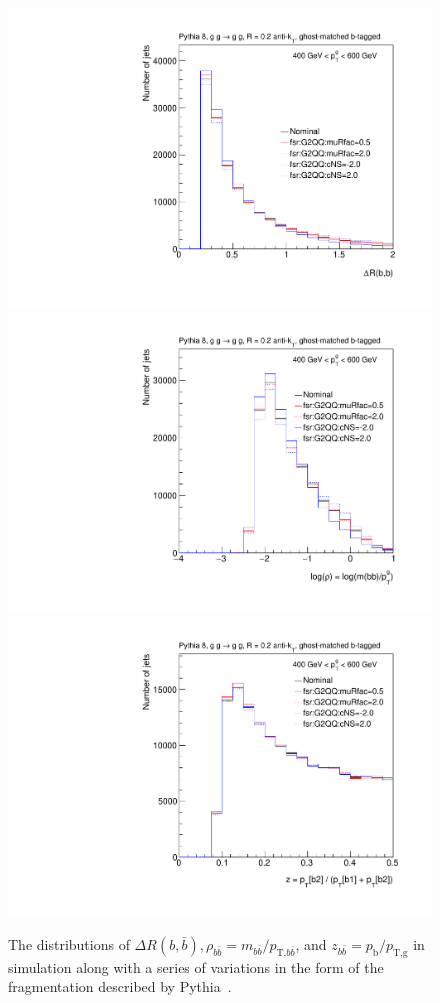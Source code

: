 \begin{figure}[htpb!]
\begin{center}
\includegraphics[width=0.33\linewidth]{figures/gbb/truth_level/DeltaRbb.pdf}\includegraphics[width=0.33\linewidth]{figures/gbb/truth_level/rhobb.pdf}\includegraphics[width=0.33\linewidth]{figures/gbb/truth_level/DeltaZbb.pdf}
\caption{The distributions of $\Delta R(b,\bar{b}), \rho_{b\bar{b}}=m_{b\bar{b}}/p_\text{T,$b\bar{b}$}$, and $z_{b\bar{b}}=p_\text{b}/p_\text{T,g}$ in simulation along with a series of variations in the form of the fragmentation described by Pythia~\cite{pythiavariations}.} 
\label{fig:gbb-gbbdistributions}
\end{center}
\end{figure}

